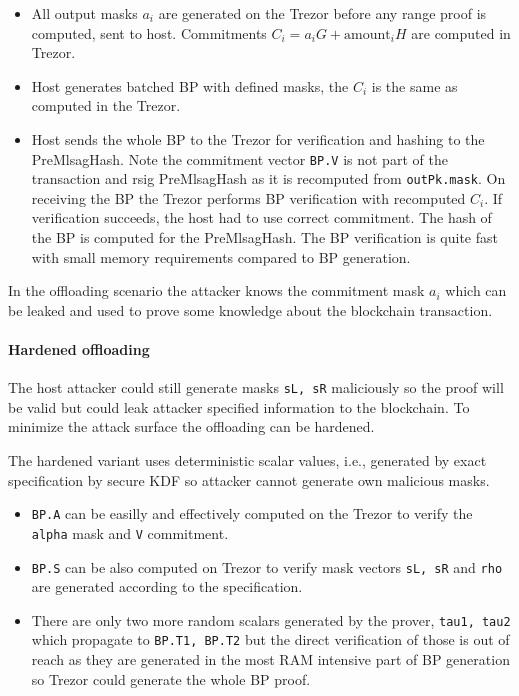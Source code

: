 \documentclass[]{article}
\begin{document}
\begin{itemize}
	\item All output masks $a_i$ are generated on the Trezor before any range proof is computed, sent to host. Commitments $C_i = a_iG + \text{amount}_i H$ are computed in Trezor.
	
	\item Host generates batched BP with defined masks, the $C_i$ is the same as computed in the Trezor.
	
	\item Host sends the whole BP to the Trezor for verification and hashing to the PreMlsagHash. Note the commitment vector \verb|BP.V| is not part of the transaction and rsig PreMlsagHash as it is recomputed from \verb|outPk.mask|. On receiving the BP the Trezor performs BP verification with recomputed $C_i$. If verification succeeds, the host had to use correct commitment. The hash of the BP is computed for the PreMlsagHash. The BP verification is quite fast with small memory requirements compared to BP generation.
\end{itemize}

In the offloading scenario the attacker knows the commitment mask $a_i$ which can be leaked and used to prove some knowledge about the blockchain transaction.

\paragraph{Hardened offloading}
The host attacker could still generate masks 
\verb|sL, sR| maliciously so the proof will be valid but could leak attacker specified information to the blockchain. To minimize the attack surface the offloading can be hardened.

The hardened variant uses deterministic scalar values, i.e., generated by exact specification by secure KDF so attacker cannot generate own malicious masks.

\begin{itemize}
	\item \verb|BP.A| can be easilly and effectively computed on the Trezor to verify the \verb|alpha| mask and \verb|V| commitment.
	
	\item \verb|BP.S| can be also computed on Trezor to verify mask vectors \verb|sL, sR| and \verb|rho| are generated according to the specification.
	
	\item There are only two more random scalars generated by the prover, \verb|tau1, tau2| which propagate to \verb|BP.T1, BP.T2| but the direct verification of those is out of reach as they are generated in the most RAM intensive part of BP generation so Trezor could generate the whole BP proof.
\end{itemize}
\end{document}

